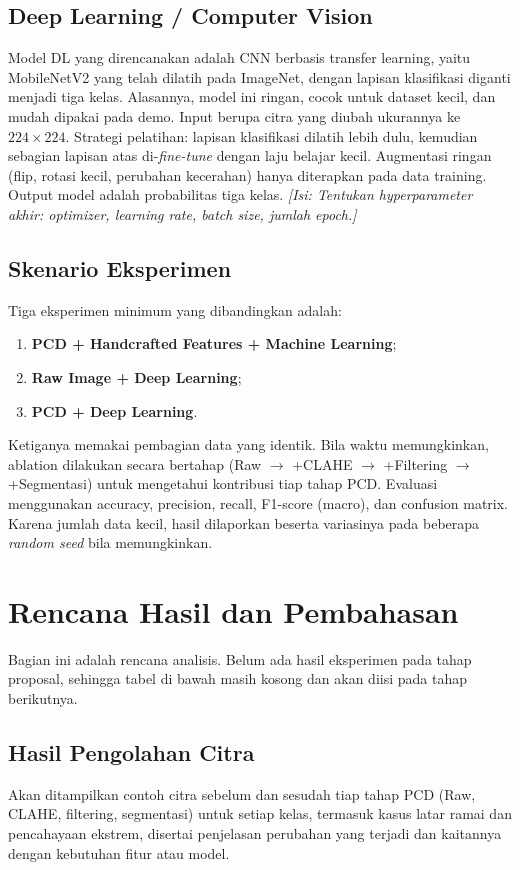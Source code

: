 \documentclass[10pt,twocolumn,a4paper]{article}
\newcommand{\isian}[1]{\textcolor{notegray}{\textit{[Isi: #1]}}}
\begin{document}
\subsection{Deep Learning / Computer Vision}
Model DL yang direncanakan adalah CNN berbasis transfer learning, yaitu MobileNetV2 \cite{sandler2018mobilenetv2} yang telah dilatih pada ImageNet, dengan lapisan klasifikasi diganti menjadi tiga kelas. Alasannya, model ini ringan, cocok untuk dataset kecil, dan mudah dipakai pada demo. Input berupa citra yang diubah ukurannya ke $224\times224$. Strategi pelatihan: lapisan klasifikasi dilatih lebih dulu, kemudian sebagian lapisan atas di-\textit{fine-tune} dengan laju belajar kecil. Augmentasi ringan (flip, rotasi kecil, perubahan kecerahan) hanya diterapkan pada data training. Output model adalah probabilitas tiga kelas. \isian{Tentukan hyperparameter akhir: optimizer, learning rate, batch size, jumlah epoch.}

\subsection{Skenario Eksperimen}
Tiga eksperimen minimum yang dibandingkan adalah:
\begin{enumerate}[leftmargin=*]
    \item \textbf{PCD + Handcrafted Features + Machine Learning};
    \item \textbf{Raw Image + Deep Learning};
    \item \textbf{PCD + Deep Learning}.
\end{enumerate}
Ketiganya memakai pembagian data yang identik. Bila waktu memungkinkan, ablation dilakukan secara bertahap (Raw $\rightarrow$ +CLAHE $\rightarrow$ +Filtering $\rightarrow$ +Segmentasi) untuk mengetahui kontribusi tiap tahap PCD. Evaluasi menggunakan accuracy, precision, recall, F1-score (macro), dan confusion matrix. Karena jumlah data kecil, hasil dilaporkan beserta variasinya pada beberapa \textit{random seed} bila memungkinkan.

\section{Rencana Hasil dan Pembahasan}
Bagian ini adalah rencana analisis. Belum ada hasil eksperimen pada tahap proposal, sehingga tabel di bawah masih kosong dan akan diisi pada tahap berikutnya.

\subsection{Hasil Pengolahan Citra}
Akan ditampilkan contoh citra sebelum dan sesudah tiap tahap PCD (Raw, CLAHE, filtering, segmentasi) untuk setiap kelas, termasuk kasus latar ramai dan pencahayaan ekstrem, disertai penjelasan perubahan yang terjadi dan kaitannya dengan kebutuhan fitur atau model.
\end{document}
